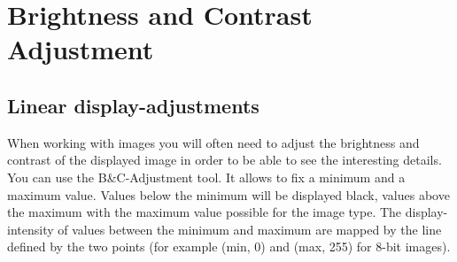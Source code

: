 \chapter{Brightness and Contrast Adjustment}

\section{Linear display-adjustments}

When working with images you will often need to adjust the brightness and contrast of the displayed image in order to be able to see the interesting details. You can use the B\&C-Adjustment tool. It allows to fix a minimum and a maximum value. Values below the minimum will be displayed black, values above the maximum with the maximum value possible for the image type. The display-intensity of values between the minimum and maximum are mapped by the line defined by the two points (for example (min, 0) and (max, 255) for 8-bit images).


